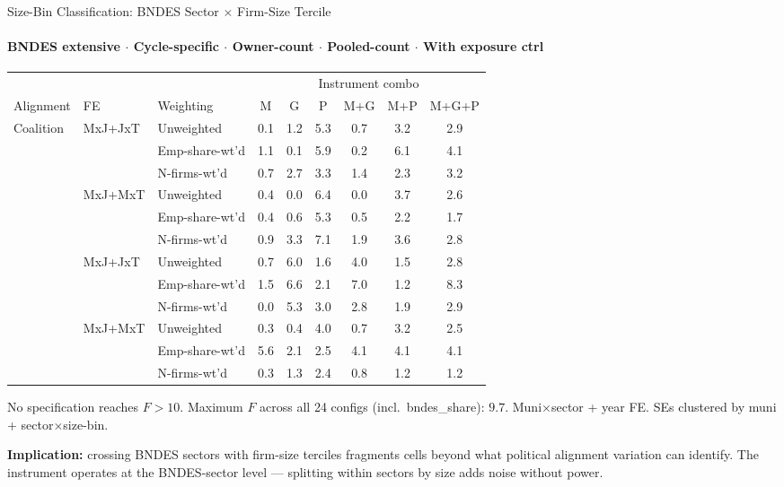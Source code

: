 \documentclass[aspectratio=169,10pt]{beamer}
\begin{document}

\begin{frame}[t,shrink=12]{Size-Bin Classification: BNDES Sector $\times$ Firm-Size Tercile}
\framesubtitle{BNDES extensive $\cdot$ Cycle-specific $\cdot$ Owner-count $\cdot$ Pooled-count $\cdot$ With exposure ctrl}
\begin{center}
\footnotesize
\setlength{\tabcolsep}{3pt}
\renewcommand{\arraystretch}{1.05}
\begin{tabular}{@{}lllcccccc@{}}
\toprule
 & & & \multicolumn{6}{c}{Instrument combo} \\
\cmidrule(l{2pt}r{2pt}){4-9}
Alignment & FE & Weighting & M & G & P & M+G & M+P & M+G+P \\
\midrule
\multirow{6}{*}{Coalition}
 & \multirow{3}{*}{MxJ+JxT}
   & Unweighted      & 0.1 & 1.2 & 5.3 & 0.7 & 3.2 & 2.9 \\
 & & Emp-share-wt'd  & 1.1 & 0.1 & 5.9 & 0.2 & 6.1 & 4.1 \\
 & & N-firms-wt'd    & 0.7 & 2.7 & 3.3 & 1.4 & 2.3 & 3.2 \\
 & \multirow{3}{*}{MxJ+MxT}
   & Unweighted      & 0.4 & 0.0 & 6.4 & 0.0 & 3.7 & 2.6 \\
 & & Emp-share-wt'd  & 0.4 & 0.6 & 5.3 & 0.5 & 2.2 & 1.7 \\
 & & N-firms-wt'd    & 0.9 & 3.3 & 7.1 & 1.9 & 3.6 & 2.8 \\
\addlinespace[4pt]
\multirow{6}{*}{Party}
 & \multirow{3}{*}{MxJ+JxT}
   & Unweighted      & 0.7 & 6.0 & 1.6 & 4.0 & 1.5 & 2.8 \\
 & & Emp-share-wt'd  & 1.5 & 6.6 & 2.1 & 7.0 & 1.2 & 8.3 \\
 & & N-firms-wt'd    & 0.0 & 5.3 & 3.0 & 2.8 & 1.9 & 2.9 \\
 & \multirow{3}{*}{MxJ+MxT}
   & Unweighted      & 0.3 & 0.4 & 4.0 & 0.7 & 3.2 & 2.5 \\
 & & Emp-share-wt'd  & 5.6 & 2.1 & 2.5 & 4.1 & 4.1 & 4.1 \\
 & & N-firms-wt'd    & 0.3 & 1.3 & 2.4 & 0.8 & 1.2 & 1.2 \\
\bottomrule
\end{tabular}
\end{center}
{\scriptsize No specification reaches $F>10$.  Maximum $F$ across all 24 configs (incl.\ bndes\_share): $9.7$.
Muni$\times$sector + year FE. SEs clustered by muni + sector$\times$size-bin.}

\vspace{0.3em}
\textcolor{alertred}{\footnotesize\textbf{Implication:} crossing BNDES sectors with firm-size terciles fragments cells beyond what political alignment variation can identify.  The instrument operates at the BNDES-sector level --- splitting within sectors by size adds noise without power.}
\end{frame}
\end{document}
